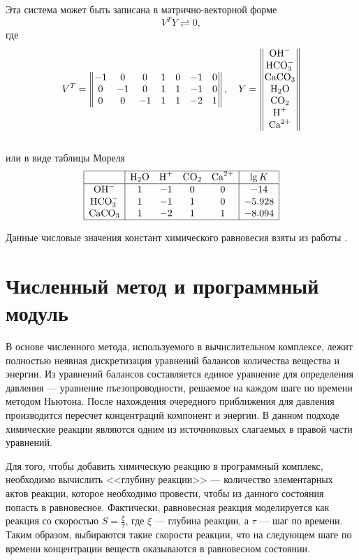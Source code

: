 \documentclass[14pt,a4paper]{extarticle}
\begin{document}
Эта  система может быть записана в матрично-векторной форме $$V^T Y \rightleftharpoons 0,$$ где
$$V^T =  \begin{Vmatrix}
-1 &0 &0  &1 &0 &-1 &0\\
0 &-1 &0  &1 &1 &-1 &0\\
0  &0 &-1  &1 &1 &-2 &1
		\end{Vmatrix}, \quad
  Y = \begin{Vmatrix}
  \text{OH}^-\\
  \text{HCO}_3^{-}\\
  \text{CaCO}_3\\
  \text{H}_2\text{O}\\
  \text{CO}_2\\
  \text{H}^+\\
  \text{Ca}^{2+}
  \end{Vmatrix}$$\\
или в виде таблицы Мореля \cite{morel}\\
$$\begin{array}{|c|cccc|c|}
\hline
		&\text{H}_2\text{O}	&\text{H}^+	&\text{CO}_2	&\text{Ca}^{2+}	&\lg {K}\\
\hline
\text{OH}^-		&1		&-1		&0		  &0		&-14\\
\text{HCO}_3^{-}	&1		&-1		&1		  &0		&-5.928\\
\text{CaCO}_3		&1		&-2		&1		  &1		&-8.094\\
\hline
\end{array}$$

Данные числовые значения констант химического равновесия взяты из работы \cite{vostrikov}.

\clearpage
\section{Численный метод и программный модуль}

В основе численного метода, используемого в вычислительном комплексе, лежит полностью неявная дискретизация уравнений балансов количества вещества и энергии. Из уравнений балансов составляется единое уравнение для определения давления --- уравнение пъезопроводности, решаемое на каждом шаге по времени методом Ньютона. После нахождения очередного приближения для давления производится пересчет концентраций компонент и энергии. В данном подходе химические реакции являются одним из источниковых слагаемых в правой части уравнений.

Для того, чтобы добавить химическую реакцию в программный комплекс, необходимо вычислить <<глубину реакции>> --- количество элементарных актов реакции, которое необходимо провести, чтобы из данного состояния попасть в равновесное. Фактически, равновесная реакция моделируется как реакция со скоростью $S = \frac{\xi}{\tau}$, где $\xi$ --- глубина реакции, а $\tau$ --- шаг по времени. Таким образом, выбираются такие скорости реакции, что на следующем шаге по времени концентрации веществ оказываются в равновесном состоянии.
\end{document}
